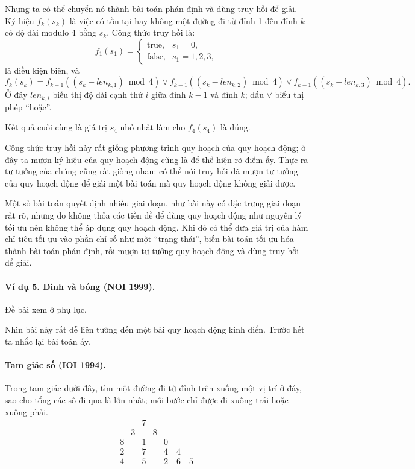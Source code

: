 \documentclass[11pt]{article}
\begin{document}
Nhưng ta có thể chuyển nó thành bài toán phán định và dùng truy hồi để giải.
Ký hiệu \(f_k(s_k)\) là việc có tồn tại hay không một đường đi từ đỉnh 1 đến
đỉnh \(k\) có độ dài modulo 4 bằng \(s_k\). Công thức truy hồi là:
\[
f_1(s_1)=
\begin{cases}
\text{true}, & s_1=0,\\
\text{false}, & s_1=1,2,3,
\end{cases}
\]
là điều kiện biên, và
\[
f_k(s_k)=
f_{k-1}((s_k-\mathit{len}_{k,1})\bmod 4)
\vee
f_{k-1}((s_k-\mathit{len}_{k,2})\bmod 4)
\vee
f_{k-1}((s_k-\mathit{len}_{k,3})\bmod 4).
\]
Ở đây \(\mathit{len}_{k,i}\) biểu thị độ dài cạnh thứ \(i\) giữa đỉnh
\(k-1\) và đỉnh \(k\); dấu \(\vee\) biểu thị phép ``hoặc''.

Kết quả cuối cùng là giá trị \(s_4\) nhỏ nhất làm cho \(f_4(s_4)\) là đúng.

Công thức truy hồi này rất giống phương trình quy hoạch của quy hoạch động;
ở đây ta mượn ký hiệu của quy hoạch động cũng là để thể hiện rõ điểm ấy. Thực
ra tư tưởng của chúng cũng rất giống nhau: có thể nói truy hồi đã mượn tư
tưởng của quy hoạch động để giải một bài toán mà quy hoạch động không giải
được.

Một số bài toán quyết định nhiều giai đoạn, như bài này có đặc trưng giai
đoạn rất rõ, nhưng do không thỏa các tiền đề để dùng quy hoạch động như
nguyên lý tối ưu nên không thể áp dụng quy hoạch động. Khi đó có thể đưa giá
trị của hàm chỉ tiêu tối ưu vào phần chỉ số như một ``trạng thái'', biến bài
toán tối ưu hóa thành bài toán phán định, rồi mượn tư tưởng quy hoạch động và
dùng truy hồi để giải.

\paragraph{Ví dụ 5. Đinh và bóng (NOI 1999).}
Đề bài xem ở phụ lục.

Nhìn bài này rất dễ liên tưởng đến một bài quy hoạch động kinh điển. Trước
hết ta nhắc lại bài toán ấy.

\paragraph{Tam giác số (IOI 1994).}
Trong tam giác dưới đây, tìm một đường đi từ đỉnh trên xuống một vị trí ở
đáy, sao cho tổng các số đi qua là lớn nhất; mỗi bước chỉ được đi xuống trái
hoặc xuống phải.
\[
\begin{array}{ccccc}
&&7&&\\
&3&&8&\\
8&&1&&0\\
2&&7&&4\quad 4\\
4&&5&&2\quad 6\quad 5
\end{array}
\]
\end{document}
